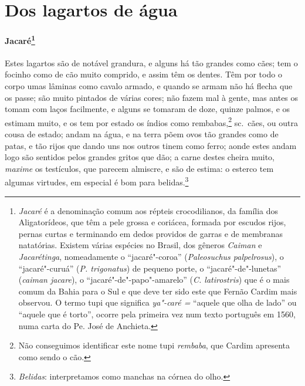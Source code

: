 \section{Dos lagartos de água}
\paragraph{Jacaré\footnote{ \textit{Jacaré} é a denominação
comum aos répteis crocodilianos, da família dos Aligatorídeos, que têm
a pele grossa e coriácea, formada por escudos rijos, pernas curtas e
terminando em dedos providos de garras e de membranas natatórias.
Existem várias espécies no Brasil, dos gêneros \textit{Caiman} e 
\textit{Jacarétinga}, nomeadamente o ``jacaré"-coroa''
(\textit{Paleosuchus palpelrosus}), o ``jacaré"-curuá'' (\textit{P.
trigonatus}) de pequeno porte, o ``jacaré"-de"-lunetas'' (\textit{caiman
jacare}), o ``jacaré"-de"-papo"-amarelo'' (\textit{C. latirostris}) que é o
mais comum da Bahia para o Sul e que deve ter sido este que Fernão
Cardim mais observou. O termo tupi que significa \textit{ya"-caré =}
``aquele que olha de lado'' ou ``aquele que é torto'', ocorre pela primeira
vez num texto português em 1560, numa carta do Pe. José de
Anchieta.}} Estes lagartos são de notável grandura, e alguns
há tão grandes como cães; tem o focinho como de cão muito comprido, e
assim têm os dentes. Têm por todo o corpo umas lâminas como cavalo
armado, e quando se armam não há flecha que os passe; são muito
pintados de várias cores; não fazem mal à gente, mas antes os tomam com
laços facilmente, e alguns se tomaram de doze, quinze palmos, e os
estimam muito, e os tem por estado os índios como rembabas,\footnote{ Não 
conseguimos identificar este nome tupi \textit{rembaba}, que
Cardim apresenta como sendo o cão.} sc.~cães, ou outra cousa de estado;
andam na água, e na terra põem ovos tão grandes como de patas, e tão
rijos que dando uns nos outros tinem como ferro; aonde estes andam logo
são sentidos pelos grandes gritos que dão; a carne destes cheira muito,
\textit{maxime} os testículos, que parecem almiscre, e são de estima: o esterco
tem algumas virtudes, em especial é bom para belidas.\footnote{ \textit{Belidas}: 
interpretamos como manchas na córnea do olho.} 


